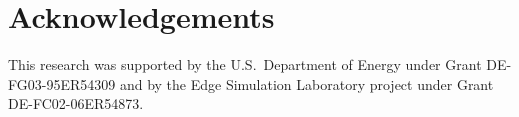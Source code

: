 \documentclass[11pt]{article}
\begin{document}
\section*{Acknowledgements}

This research was supported by the U.S.\ Department of
Energy under Grant DE-FG03-95ER54309 and by the Edge Simulation Laboratory
project under Grant DE-FC02-06ER54873.



\end{document}
